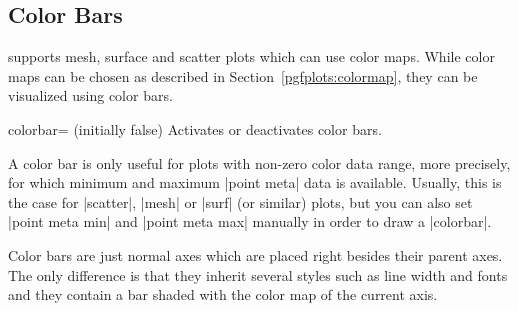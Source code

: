 \subsection{Color Bars}
\label{pgfplots:colorbar}

\PGFPlots{} supports mesh, surface and scatter plots which can use color maps.
While color maps can be chosen as described in Section~\ref{pgfplots:colormap},
they can be visualized using color bars.

\begin{pgfplotskey}{colorbar= (initially false)}
    Activates or deactivates color bars.
\begin{codeexample}[]
\end{codeexample}

\begin{codeexample}[]
\end{codeexample}

\begin{codeexample}[]
\end{codeexample}

    A color bar is only useful for plots with non-zero color data range, more
    precisely, for which minimum and maximum |point meta| data is available.
    Usually, this is the case for |scatter|, |mesh| or |surf| (or similar)
    plots, but you can also set |point meta min| and |point meta max| manually
    in order to draw a |colorbar|.

    Color bars are just normal axes which are placed right besides their parent
    axes. The only difference is that they inherit several styles such as line
    width and fonts and they contain a bar shaded with the color map of the
    current axis.


\end{pgfplotskey}
